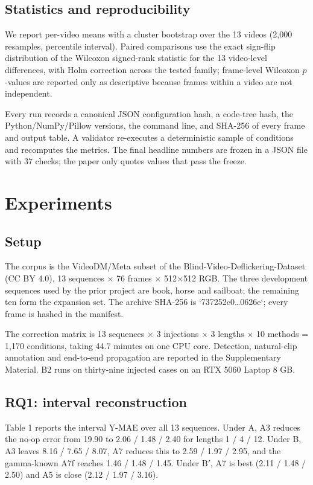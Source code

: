 \documentclass[twocolumn,10pt]{svjour3}
\begin{document}
\subsection{Statistics and reproducibility}

We report per-video means with a cluster bootstrap over the 13 videos (2,000 resamples, percentile interval). Paired comparisons use the exact sign-flip distribution of the Wilcoxon signed-rank statistic for the 13 video-level differences, with Holm correction across the tested family; frame-level Wilcoxon $p$-values are reported only as descriptive because frames within a video are not independent.


Every run records a canonical JSON configuration hash, a code-tree hash, the Python/NumPy/Pillow versions, the command line, and SHA-256 of every frame and output table. A validator re-executes a deterministic sample of conditions and recomputes the metrics. The final headline numbers are frozen in a JSON file with 37 checks; the paper only quotes values that pass the freeze.


\section{Experiments}

\subsection{Setup}

The corpus is the VideoDM/Meta subset of the Blind-Video-Deflickering-Dataset (CC BY 4.0), 13 sequences $\times$ 76 frames $\times$ 512$\times$512 RGB. The three development sequences used by the prior project are book, horse and sailboat; the remaining ten form the expansion set. The archive SHA-256 is `737252c0…0626e`; every frame is hashed in the manifest.


The correction matrix is 13 sequences $\times$ 3 injections $\times$ 3 lengths $\times$ 10 methods = 1,170 conditions, taking 44.7 minutes on one CPU core. Detection, natural-clip annotation and end-to-end propagation are reported in the Supplementary Material. B2 runs on thirty-nine injected cases on an RTX 5060 Laptop 8 GB.


\subsection{RQ1: interval reconstruction}

Table 1 reports the interval Y-MAE over all 13 sequences. Under A, A3 reduces the no-op error from 19.90 to 2.06 / 1.48 / 2.40 for lengths 1 / 4 / 12. Under B, A3 leaves 8.16 / 7.65 / 8.07, A7 reduces this to 2.59 / 1.97 / 2.95, and the gamma-known A7f reaches 1.46 / 1.48 / 1.45. Under B$'$, A7 is best (2.11 / 1.48 / 2.50) and A5 is close (2.12 / 1.97 / 3.16).
\end{document}
